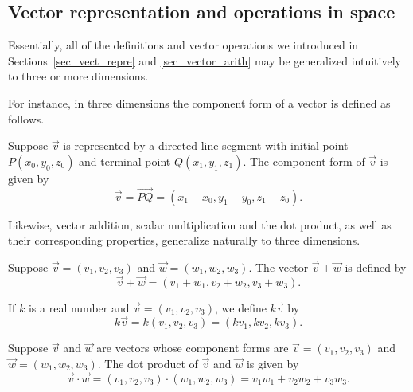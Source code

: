 \subsection{Vector representation and operations in space}
Essentially, all of the definitions and vector operations we introduced in Sections~\ref{sec_vect_repre} and \ref{sec_vector_arith} may be generalized intuitively to three or more dimensions.

\ifcalculus
For instance, in three dimensions the component form of a vector is defined as follows. 
\begin{definition} \label{componentformvector3d}  Suppose $\vec{v}$ is represented by a directed line segment with initial point $P\left(x_0, y_0,z_0\right)$ and terminal point $Q\left(x_1, y_1,z_1\right)$.  The component form of $\vec{v}$ is given by 
\[ \vec{v} = \overrightarrow{PQ} = \left( x_1 - x_0, y_1 - y_0, z_1-z_0 \right). \]


\end{definition}

Likewise, vector addition, scalar multiplication and the dot product, as well as their corresponding properties, generalize naturally to three dimensions.

\begin{definition} \label{vectoradd3d} 
 Suppose $\vec{v} = \left(v_1,v_2,v_3\right)$ and $\vec{w} = \left(w_1,w_2,w_3\right)$.  The vector $\vec{v} + \vec{w}$ is defined by 
\[ \vec{v} + \vec{w}  = \left( v_1 + w_1, v_2 + w_2, v_3+ w_3\right). \]


\end{definition}

\pagebreak

\begin{definition} \label{scalarmultvector3d}    If $k$ is a real number and $\vec{v} = \left(v_1,v_2,v_3\right)$, we define $k\vec{v}$ by 
\[k\vec{v} = k\left(v_1,v_2,v_3\right) =\left(k v_1,k v_2, k v_3\right). \]

\end{definition}


\begin{definition} \label{dotproductdefnnd}    
Suppose $\vec{v}$ and $\vec{w}$ are vectors whose component forms are $\vec{v} = \left(v_1,v_2,v_3\right)$ and $\vec{w} = \left(w_1,w_2,w_3\right)$.  The dot product   of $\vec{v}$ and $\vec{w}$ is given by
\[ \vec{v} \cdot \vec{w} = \left(v_1,v_2,v_3\right) \cdot \left(w_1,w_2,w_3\right) = v_1w_1 + v_2w_2 + v_3w_3. \]

\end{definition}



